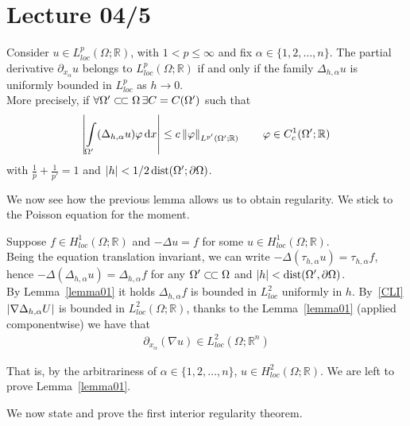 \chapter{Lecture 04/5}

\begin{lem}\label{lemma01}
	Consider \( u\in L_{loc}^{p}(\Omega ;\mathbb{R}) \), with \( 1< p \leq  \infty  \) and fix \( \alpha \in \{ 1,2,\ldots,n \} \). The partial derivative \( \partial_{x_{\alpha }}u \) belongs to \( L_{loc}^{p}(\Omega ;\mathbb{R}) \) if and only if the family \( \Delta _{h,\alpha }u \) is uniformly bounded in \( L_{loc}^{p} \) as \( h \to 0 \).\\
	More precisely, if \( \forall \Omega' \ssubset \Omega \, \exists C=C(\Omega') \) such that
	\begin{gather}
		\left\lvert\int\limits_{\Omega'}^{} (\Delta _{h,\alpha }u) \varphi  \mathop{}\!\mathrm{d}x\right\rvert\leq c\left\lVert\varphi \right\rVert_{L^{p'}(\Omega';\mathbb{R})} \qquad \varphi \in C_{c}^{1}(\Omega';\mathbb{R})
	\end{gather}
	with \( \frac{1}{p}+\frac{1}{p'}=1 \) and \( \abs{h}< \frac{1}{2} \operatorname{dist}(\Omega';\partial \Omega )  \).
\end{lem}
We now see how the previous lemma allows us to obtain regularity. We stick to the Poisson equation for the moment. \par
Suppose \( f \in H_{loc}^{1}(\Omega ;\mathbb{R})  \) and \( -\Delta u=f \) for some \( u \in H_{loc}^{1}(\Omega ; \mathbb{R})  \).\\
Being the equation translation invariant, we can write \( -\Delta (\tau _{h,\alpha }u) = \tau _{h, \alpha }f \), hence \( -\Delta (\Delta _{h, \alpha }u) = \Delta _{h, \alpha }f \) for any \( \Omega' \ssubset \Omega  \) and \( \left\lvert h\right\rvert< \operatorname{dist}(\Omega', \partial \Omega )  \). \\
By Lemma~\ref{lemma01} it holds \( \Delta _{h, \alpha }f \) is bounded in \( L_{loc}^{2} \) uniformly in \( h \). By~\eqref{CLI} \( \left\lvert\nabla \Delta _{h, \alpha }U\right\rvert \) is bounded in \( L_{loc}^{2}(\Omega ;\mathbb{R})  \), thanks to the Lemma~\ref{lemma01} (applied componentwise) we have that
\begin{gather}
	\partial_{x_{\alpha }}(\nabla u) \in L_{loc}^{2}(\Omega ;\mathbb{R}^{n})
\end{gather}

That is, by the arbitrariness of \( \alpha \in \{ 1,2,\ldots,n \} \), \( u \in H_{loc}^{2}(\Omega ;\mathbb{R})  \). We are left to prove Lemma~\ref{lemma01}.\\
\par
We now state and prove the first interior regularity theorem.

